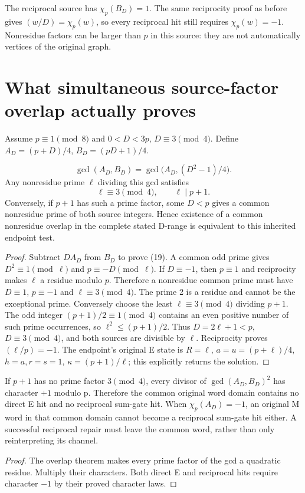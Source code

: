 The reciprocal source has $\chi_p(B_D)=1$. The same reciprocity proof as before
gives $(w/D)=\chi_p(w)$, so every reciprocal hit still requires $\chi_p(w)=-1$.
Nonresidue factors can be larger than $p$ in this source: they are not automatically
vertices of the original graph.

\section{What simultaneous source-factor overlap actually proves}
Assume $p\equiv1\pmod8$ and $0<D<3p$, $D\equiv3\pmod4$. Define
$A_D=(p+D)/4$, $B_D=(pD+1)/4$.
\begin{theorem}
\[
 \gcd(A_D,B_D)=\gcd\bigl(A_D,(D^2-1)/4\bigr).            \tag{19}
\]
Any nonresidue prime $\ell$ dividing this gcd satisfies
\[
 \ell\equiv3\pmod4,\qquad \ell\mid p+1.
\]
Conversely, if $p+1$ has such a prime factor, some $D<p$ gives a common nonresidue
prime of both source integers. Hence existence of a common nonresidue overlap
in the complete stated D-range is equivalent to this inherited endpoint test.
\end{theorem}
\begin{proof}
Subtract $DA_D$ from $B_D$ to prove (19). A common odd prime gives
$D^2\equiv1\pmod\ell$ and $p\equiv-D\pmod\ell$. If $D\equiv-1$, then
$p\equiv1$ and reciprocity makes $\ell$ a residue modulo $p$. Therefore a
nonresidue common prime must have $D\equiv1$, $p\equiv-1$ and $\ell\equiv3\pmod4$.
The prime 2 is a residue and cannot be the exceptional prime.
Conversely choose the least $\ell\equiv3\pmod4$ dividing $p+1$. The odd integer
$(p+1)/2\equiv1\pmod4$ contains an even positive number of such prime occurrences,
so $\ell^2\le(p+1)/2$. Thus $D=2\ell+1<p$, $D\equiv3\pmod4$, and both
sources are divisible by $\ell$. Reciprocity proves $(\ell/p)=-1$.
The endpoint's original E state is $R=\ell$, $a=u=(p+\ell)/4$, $h=a,r=s=1$,
$\kappa=(p+1)/\ell$; this explicitly returns the solution.
\end{proof}
\begin{corollary}
If $p+1$ has no prime factor $3\pmod4$, every divisor of
$\gcd(A_D,B_D)^2$ has character $+1$ modulo p. Therefore the common original
word domain contains no direct E hit and no reciprocal sum-gate hit. When
$\chi_p(A_D)=-1$, an original M word in that common domain cannot become a
reciprocal sum-gate hit either. A successful reciprocal repair must leave the
common word, rather than only reinterpreting its channel.
\end{corollary}
\begin{proof}
The overlap theorem makes every prime factor of the gcd a quadratic residue.
Multiply their characters. Both direct E and reciprocal hits require character
$-1$ by their proved character laws.
\end{proof}


